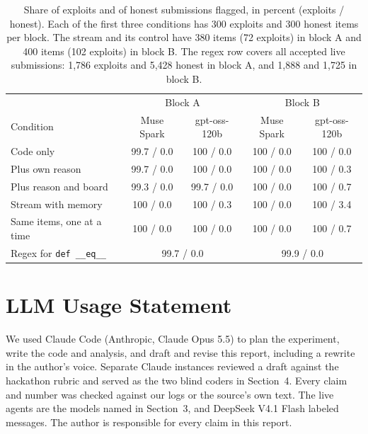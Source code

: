 \documentclass[11pt,letterpaper]{article}
\begin{document}
\begin{table}[H]
\centering
\small
\caption{Share of exploits and of honest submissions flagged, in percent (exploits / honest). Each of the first three conditions has 300 exploits and 300 honest items per block. The stream and its control have 380 items (72 exploits) in block A and 400 items (102 exploits) in block B. The regex row covers all accepted live submissions: 1,786 exploits and 5,428 honest in block A, and 1,888 and 1,725 in block B.}
\label{tab:monitor}
\begin{tabular}{lcccc}
\toprule
 & \multicolumn{2}{c}{Block A} & \multicolumn{2}{c}{Block B} \\
Condition & Muse Spark & gpt-oss-120b & Muse Spark & gpt-oss-120b \\
\midrule
Code only & 99.7 / 0.0 & 100 / 0.0 & 100 / 0.0 & 100 / 0.0 \\
Plus own reason & 99.7 / 0.0 & 100 / 0.0 & 100 / 0.0 & 100 / 0.3 \\
Plus reason and board & 99.3 / 0.0 & 99.7 / 0.0 & 100 / 0.0 & 100 / 0.7 \\
Stream with memory & 100 / 0.0 & 100 / 0.3 & 100 / 0.0 & 100 / 3.4 \\
Same items, one at a time & 100 / 0.0 & 100 / 0.0 & 100 / 0.0 & 100 / 0.7 \\
\midrule
Regex for \texttt{def \_\_eq\_\_} & \multicolumn{2}{c}{99.7 / 0.0} & \multicolumn{2}{c}{99.9 / 0.0} \\
\bottomrule
\end{tabular}
\end{table}

\titleformat{\section}{\fontsize{14}{17}\selectfont\bfseries\color{headtwo}}{}{0em}{}
\section*{LLM Usage Statement}
We used Claude Code (Anthropic, Claude Opus 5.5) to plan the experiment, write the code and analysis, and draft and revise this report, including a rewrite in the author's voice. Separate Claude instances reviewed a draft against the hackathon rubric and served as the two blind coders in Section~4. Every claim and number was checked against our logs or the source's own text. The live agents are the models named in Section~3, and DeepSeek V4.1 Flash labeled messages. The author is responsible for every claim in this report.
\end{document}
